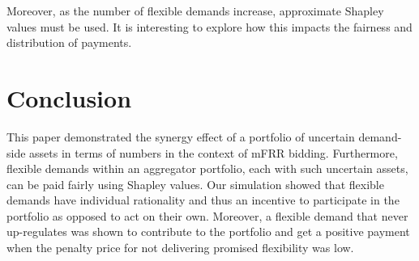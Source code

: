 \documentclass[lettersize,journal]{IEEEtran}
\begin{document}
Moreover, as the number of flexible demands increase, approximate Shapley values must be used. It is interesting to explore how this impacts the fairness and distribution of payments.

\section{Conclusion}

This paper demonstrated the synergy effect of a portfolio of uncertain demand-side assets in terms of numbers in the context of mFRR bidding. Furthermore, flexible demands within an aggregator portfolio, each with such uncertain assets, can be paid fairly using Shapley values. Our simulation showed that flexible demands have individual rationality and thus an incentive to participate in the portfolio as opposed to act on their own. Moreover, a flexible demand that never up-regulates was shown to contribute to the portfolio and get a positive payment when the penalty price for not delivering promised flexibility was low.


% 



\vfill
\end{document}
